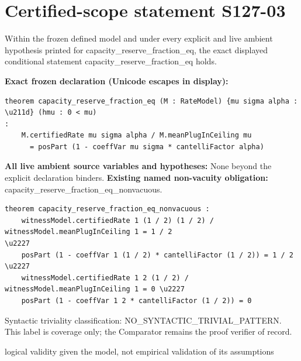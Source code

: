 \documentclass[11pt]{article}
\begin{document}
\section*{Certified-scope statement S127-03}
Within the frozen defined model and under every explicit and live ambient hypothesis printed for capacity\_\allowbreak{}reserve\_\allowbreak{}fraction\_\allowbreak{}eq, the exact displayed conditional statement capacity\_\allowbreak{}reserve\_\allowbreak{}fraction\_\allowbreak{}eq holds.
\par\noindent\textbf{Exact frozen declaration (Unicode escapes in display):}
\begin{Verbatim}[breaklines=true,breakanywhere=true,fontsize=\scriptsize]
theorem capacity_reserve_fraction_eq (M : RateModel) {mu sigma alpha : \u211d} (hmu : 0 < mu)
:
    M.certifiedRate mu sigma alpha / M.meanPlugInCeiling mu
      = posPart (1 - coeffVar mu sigma * cantelliFactor alpha)
\end{Verbatim}
\noindent\textbf{All live ambient source variables and hypotheses:}
None beyond the explicit declaration binders.
\noindent\textbf{Existing named non-vacuity obligation:} capacity\_\allowbreak{}reserve\_\allowbreak{}fraction\_\allowbreak{}eq\_\allowbreak{}nonvacuous.
\begin{Verbatim}[breaklines=true,breakanywhere=true,fontsize=\scriptsize]
theorem capacity_reserve_fraction_eq_nonvacuous :
    witnessModel.certifiedRate 1 (1 / 2) (1 / 2) / witnessModel.meanPlugInCeiling 1 = 1 / 2
\u2227
    posPart (1 - coeffVar 1 (1 / 2) * cantelliFactor (1 / 2)) = 1 / 2 \u2227
    witnessModel.certifiedRate 1 2 (1 / 2) / witnessModel.meanPlugInCeiling 1 = 0 \u2227
    posPart (1 - coeffVar 1 2 * cantelliFactor (1 / 2)) = 0
\end{Verbatim}
\noindent Syntactic triviality classification: NO\_\allowbreak{}SYNTACTIC\_\allowbreak{}TRIVIAL\_\allowbreak{}PATTERN. This label is coverage only; the Comparator remains the proof verifier of record.
\par\noindent logical validity given the model, not empirical validation of its assumptions
\end{document}
